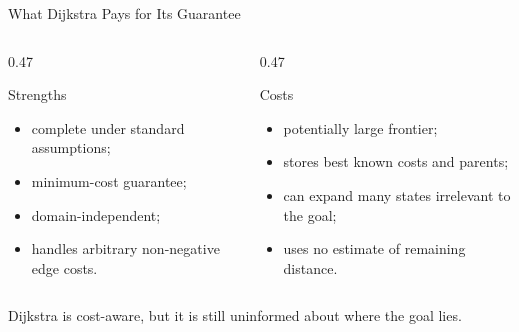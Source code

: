 \documentclass[aspectratio=169,10pt]{beamer}
\begin{document}
\begin{frame}[shrink=20]{What Dijkstra Pays for Its Guarantee}
  \begin{columns}[T,onlytextwidth]
    \begin{column}{0.47\textwidth}
      \begin{block}{Strengths}
        \begin{itemize}
          \item complete under standard assumptions;
          \item minimum-cost guarantee;
          \item domain-independent;
          \item handles arbitrary non-negative edge costs.
        \end{itemize}
      \end{block}
    \end{column}

    \begin{column}{0.47\textwidth}
      \begin{block}{Costs}
        \begin{itemize}
          \item potentially large frontier;
          \item stores best known costs and parents;
          \item can expand many states irrelevant to the goal;
          \item uses no estimate of remaining distance.
        \end{itemize}
      \end{block}
    \end{column}
  \end{columns}

  \begin{keyidea}
    Dijkstra is cost-aware, but it is still uninformed about where the goal lies.
  \end{keyidea}
\end{frame}

\end{document}
